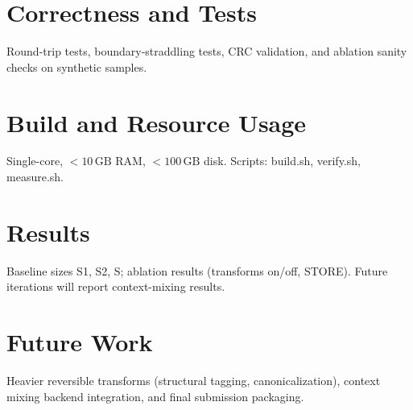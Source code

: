 \documentclass[11pt]{article}
\begin{document}
\section{Correctness and Tests}
Round-trip tests, boundary-straddling tests, CRC validation, and ablation sanity checks on synthetic samples.
\section{Build and Resource Usage}
Single-core, $<10\,\mathrm{GB}$ RAM, $<100\,\mathrm{GB}$ disk. Scripts: build.sh, verify.sh, measure.sh.
\section{Results}
Baseline sizes S1, S2, S; ablation results (transforms on/off, STORE). Future iterations will report context-mixing results.
\section{Future Work}
Heavier reversible transforms (structural tagging, canonicalization), context mixing backend integration, and final submission packaging.
\end{document}
